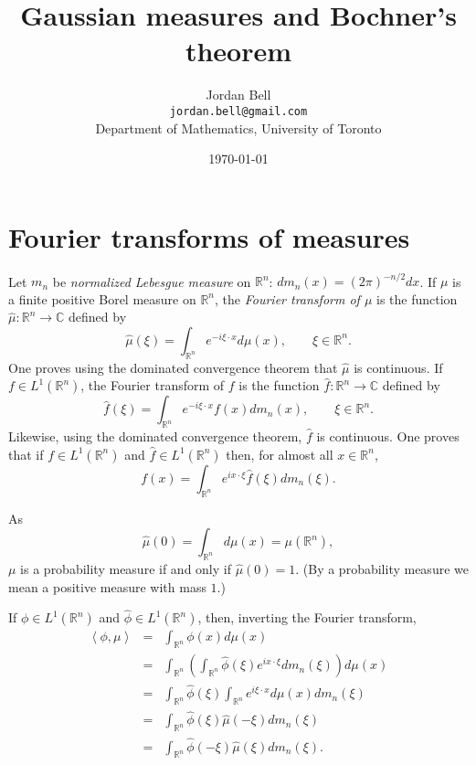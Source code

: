 \documentclass{article}
\newcommand{\inner}[2]{\left\langle #1, #2 \right\rangle}
\theoremstyle{definition}
\begin{document}
\title{Gaussian measures and Bochner's theorem}
\author{Jordan Bell\\ \texttt{jordan.bell@gmail.com}\\Department of Mathematics, University of Toronto}
\date{\today}

\maketitle

\section{Fourier transforms of measures}
Let $m_n$ be {\em normalized Lebesgue measure} on $\mathbb{R}^n$: $dm_n(x) = (2\pi)^{-n/2} dx$. 
If $\mu$ is a finite  positive Borel  measure on $\mathbb{R}^n$, the {\em Fourier transform of $\mu$} is the function
$\hat{\mu}:\mathbb{R}^n \to \mathbb{C}$ defined by
\[
\hat{\mu}(\xi) = \int_{\mathbb{R}^n} e^{-i\xi \cdot x} d\mu(x), \qquad \xi \in \mathbb{R}^n.
\]
One proves using the dominated convergence theorem that $\hat{\mu}$ is continuous.
If $f \in L^1(\mathbb{R}^n)$, the Fourier transform of $f$ is the function $\hat{f}:\mathbb{R}^n \to \mathbb{C}$ defined by
\[
\hat{f}(\xi) = \int_{\mathbb{R}^n} e^{-i\xi\cdot x} f(x) dm_n(x), \qquad \xi \in \mathbb{R}^n.
\]
Likewise, using the dominated convergence theorem, $\hat{f}$ is continuous.
One proves that if $f \in L^1(\mathbb{R}^n)$ and $\hat{f} \in L^1(\mathbb{R}^n)$ then, for almost all $x \in \mathbb{R}^n$,
\[
f(x) = \int_{\mathbb{R}^n} e^{ix\cdot \xi} \hat{f}(\xi) dm_n(\xi).
\]

As
\[
\hat{\mu}(0)=\int_{\mathbb{R}^n} d\mu(x) = \mu(\mathbb{R}^n),
\]
$\mu$ is a probability measure if and only if $\hat{\mu}(0)=1$. (By a probability measure we mean a positive measure with mass $1$.)

If $\phi \in L^1(\mathbb{R}^n)$ and $\hat{\phi} \in L^1(\mathbb{R}^n)$, then, inverting the Fourier transform,
\begin{eqnarray*}
\inner{\phi}{\mu}&=&\int_{\mathbb{R}^n} \phi(x) d\mu(x)\\
&=&\int_{\mathbb{R}^n} \left(\int_{\mathbb{R}^n} \hat{\phi}(\xi) e^{ix\cdot \xi} dm_n(\xi) \right) d\mu(x)\\
&=& \int_{\mathbb{R}^n} \hat{\phi}(\xi) \int_{\mathbb{R}^n} e^{i\xi \cdot x} d\mu(x) dm_n(\xi)\\
&=&\int_{\mathbb{R}^n} \hat{\phi}(\xi) \hat{\mu}(-\xi) dm_n(\xi)\\
&=&\int_{\mathbb{R}^n} \hat{\phi}(-\xi) \hat{\mu}(\xi) dm_n(\xi).
\end{eqnarray*}
\end{document}
